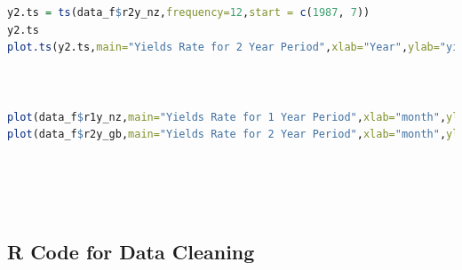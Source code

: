 \documentclass[10pt]{article}
\begin{document}
\begin{lstlisting}[language=R]
y2.ts = ts(data_f$r2y_nz,frequency=12,start = c(1987, 7))
y2.ts
plot.ts(y2.ts,main="Yields Rate for 2 Year Period",xlab="Year",ylab="yield rate in percent",frequency=12,start = c(1987, 7))



plot(data_f$r1y_nz,main="Yields Rate for 1 Year Period",xlab="month",ylab="yield rate in percent",frequency=12,start = c(1987, 7))
plot(data_f$r2y_gb,main="Yields Rate for 2 Year Period",xlab="month",ylab="yield rate in percent",frequency=12,start = c(1987, 7))






\end{lstlisting}

\subsection{R Code for Data Cleaning}
\end{document}
